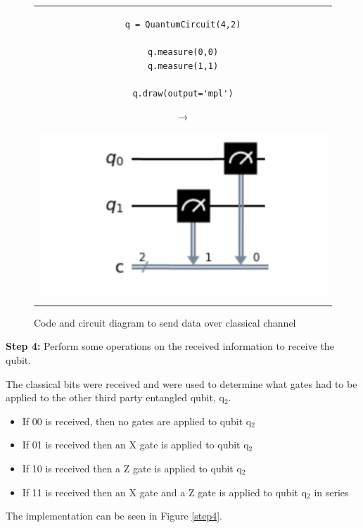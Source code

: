 \begin{figure}[H]
\centering
\begin{tabular}{c}
\begin{minipage}[c]{.45\linewidth}
\begin{verbatim}
q = QuantumCircuit(4,2)

q.measure(0,0)
q.measure(1,1)

q.draw(output='mpl')
\end{verbatim}
\end{minipage}
\begin{minipage}[c]{.1\linewidth}
\centering
$\rightarrow$
\end{minipage}
\begin{minipage}[c]{.4\linewidth}
\centering
\includegraphics[width=\textwidth]{lab3/images/Step3.png}
\end{minipage}\\
\\ 
\end{tabular}
\captionsetup{font = it, labelfont = bf, width=.91\linewidth, justification=centering}
\caption{Code and circuit diagram to send data over classical channel}
\label{step3}
\end{figure}

\textbf{Step 4:} Perform some operations on the received information to receive the qubit.

The classical bits were received and were used to determine what gates had to be applied to the other third party entangled qubit, q$_2$. 
\begin{itemize}
    \item If 00 is received, then no gates are applied to qubit q$_2$
    \item If 01 is received then an X gate is applied to qubit q$_2$
    \item If 10 is received then a Z gate is applied to qubit q$_2$
    \item If 11 is received then an X gate and a Z gate is applied to qubit q$_2$ in series
\end{itemize}
The implementation can be seen in Figure \ref{step4}.


